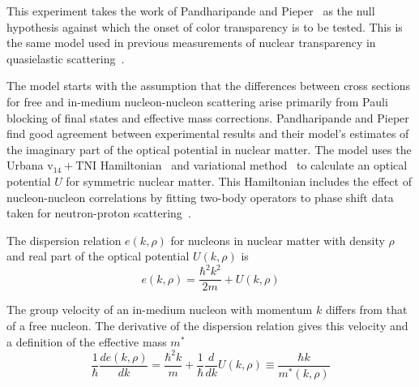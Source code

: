 This experiment takes the work of Pandharipande and
Pieper~\cite{Pandharipande_1992} as the null hypothesis against which the onset
of color transparency is to be tested.
This is the same model used in previous measurements of nuclear transparency
in quasielastic
scattering~\cite{Garrow_2002,Abbot_1998,Rohe_2005,Garino_1992}.

The model starts with the assumption that the differences between cross
sections for free and in-medium nucleon-nucleon scattering arise primarily from
Pauli blocking of final states and effective mass corrections.
Pandharipande and Pieper find good agreement between experimental results and
their model's estimates of the imaginary part of the optical potential in
nuclear matter.
The model uses the
Urbana $\text{v}_{14}+\text{TNI}$ Hamiltonian~\cite{Lagaris_1981_331, Lagaris_1981_349}
and variational method~\cite{Wiringa_1988, Friedman_1981}
to calculate an optical potential $U$ for symmetric nuclear matter.
This Hamiltonian includes the effect of nucleon-nucleon correlations by fitting
two-body operators to phase shift data taken for neutron-proton
scattering~\cite{Arndt_1966}.


The dispersion relation $e(k,\rho)$ for nucleons in nuclear matter with density
$\rho$ and real part of the optical potential $U(k,\rho)$ is
\begin{equation}
    e(k,\rho) = \frac{\hbar^2 k^2}{2m} + U(k,\rho)
\end{equation}

The group velocity of an in-medium nucleon with momentum $k$ differs from that of a
free nucleon.
The derivative of the dispersion relation gives this velocity and a
definition of the effective mass $m^*$
\begin{equation}
    \frac{1}{\hbar}\frac{de(k,\rho)}{dk}
        = \frac{\hbar^2 k}{m} + \frac{1}{\hbar}\frac{d}{dk}U(k,\rho)
        \equiv \frac{\hbar k}{m^*(k,\rho)}
\end{equation}

